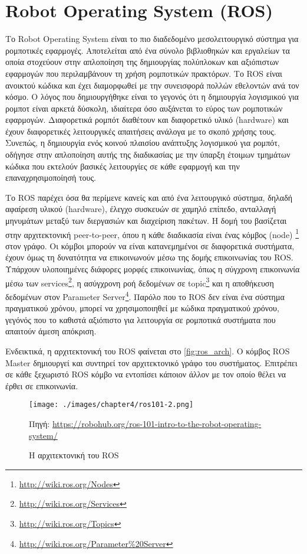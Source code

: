\section{Robot Operating System (ROS)}
\label{section:ROS}

Το Robot Operating System \cite{ros2009} είναι το πιο διαδεδομένο μεσολειτουργικό σύστημα για ρομποτικές εφαρμογές. Αποτελείται από ένα σύνολο βιβλιοθηκών και εργαλείων τα οποία στοχεύουν στην απλοποίηση της δημιουργίας πολύπλοκων και αξιόπιστων εφαρμογών που περιλαμβάνουν τη χρήση ρομποτικών πρακτόρων. Το ROS είναι ανοικτού κώδικα και έχει διαμορφωθεί με την συνεισφορά πολλών εθελοντών ανά τον κόσμο. Ο λόγος που δημιουργήθηκε είναι το γεγονός ότι η δημιουργία λογισμικού για ρομποτ είναι αρκετά δύσκολη, ιδιαίτερα όσο αυξάνεται το εύρος των ρομποτικών εφαρμογών. Διαφορετικά ρομπότ διαθέτουν και διαφορετικό υλικό (hardware) και έχουν διαφορετικές λειτουργικές απαιτήσεις ανάλογα με το σκοπό χρήσης τους. Συνεπώς, η δημιουργία ενός κοινού πλαισίου ανάπτυξης λογισμικού για ρομπότ, οδήγησε στην απλοποίηση αυτής της διαδικασίας με την ύπαρξη έτοιμων τμημάτων κώδικα που εκτελούν βασικές λειτουργίες σε κάθε εφαρμογή και την επαναχρησιμοποίησή τους.

Το ROS παρέχει όσα θα περίμενε κανείς και από ένα λειτουργικό σύστημα, δηλαδή αφαίρεση υλικού (hardware), έλεγχο συσκευών σε χαμηλό επίπεδο, ανταλλαγή μηνυμάτων μεταξύ των διεργασιών και διαχείριση πακέτων. Η δομή του βασίζεται στην αρχιτεκτονική peer-to-peer, όπου η κάθε διαδικασία είναι ένας κόμβος (node) \footnote{\href{http://wiki.ros.org/Nodes}{http://wiki.ros.org/Nodes}} στον γράφο. Οι κόμβοι μπορούν να είναι κατανεμημένοι σε διαφορετικά συστήματα, έχουν όμως τη δυνατότητα να επικοινωνούν μέσω της δομής επικοινωνίας του ROS. Υπάρχουν υλοποιημένες διάφορες μορφές επικοινωνίας, όπως η σύγχρονη επικοινωνία μέσω των services\footnote{\href{http://wiki.ros.org/Services}{http://wiki.ros.org/Services}}, η ασύγχρονη ροή δεδομένων σε topic\footnote{\href{http://wiki.ros.org/Topics}{http://wiki.ros.org/Topics}} και η αποθήκευση δεδομένων στον Parameter Server\footnote{\href{http://wiki.ros.org/Parameter\%20Server}{http://wiki.ros.org/Parameter\%20Server}}. Παρόλο που το ROS δεν είναι ένα σύστημα πραγματικού χρόνου, μπορεί να χρησιμοποιηθεί με κώδικα πραγματικού χρόνου, γεγόνός που το καθιστά αξιόπιστο για λειτουργία σε ρομποτικά συστήματα που απαιτούν άμεση απόκριση.

Ενδεικτικά, η αρχιτεκτονική του ROS φαίνεται στο \autoref{fig:ros_arch}. Ο κόμβος ROS Master δημιουργεί και συντηρεί τον αρχιτεκτονικό γράφο του συστήματος. Επιτρέπει σε κάθε ξεχωριστό ROS κόμβο να εντοπίσει κάποιον άλλον με τον οποίο θέλει να έρθει σε επικοινωνία.

\begin{figure}[!ht]
    \centering
    \texttt{[image: ./images/chapter4/ros101-2.png]}
    \caption{Η αρχιτεκτονική του ROS} 
    Πηγή: \href{https://robohub.org/ros-101-intro-to-the-robot-operating-system/}{https://robohub.org/ros-101-intro-to-the-robot-operating-system/}
    \label{fig:ros_arch}
\end{figure}

